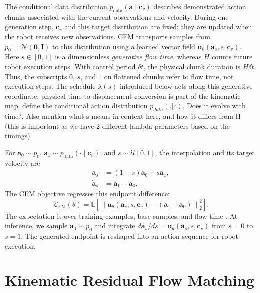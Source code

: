 \documentclass[10pt,twocolumn,letterpaper]{article}
\newcommand{\EditAP}[1]{{\color{blue} #1}}
\begin{document}
The conditional data distribution
$p_{\mathrm{data}}(\mathbf a\mid\mathbf c_v)$ describes demonstrated action
chunks associated with the current observations and velocity. During one
generation step, $\mathbf c_v$ and this target distribution are fixed;
they are updated when the robot receives new observations. CFM transports
samples from $p_0=\mathcal N(\mathbf 0,\mathbf I)$ to this distribution
using a learned vector field $\mathbf u_\theta(\mathbf a_s,s,\mathbf c_v)$.
Here $s\in[0,1]$ is a dimensionless \emph{generative flow time}, whereas
$H$ counts future robot execution steps. With control period $\delta t$,
the physical chunk duration is $H\delta t$. Thus, the subscripts $0$, $s$,
and $1$ on flattened chunks refer to flow time, not execution steps.
The schedule $\lambda(s)$ introduced below acts along this generative
coordinate; physical time-to-displacement conversion is part of the
kinematic map. \EditAP{define the conditional action distribution $p_{data}(.|c)$. Does it evolve with time?. Also mention what s means in context here, and how it differs from H (this is important as we have 2 different lambda parameters based on the timings)}

For $\mathbf a_0\sim p_0$,
$\mathbf a_1\sim p_{\mathrm{data}}(\cdot\mid\mathbf c_v)$, and
$s\sim\mathcal U[0,1]$, the interpolation and its target velocity are
\begin{align}
    \mathbf a_s &= (1-s)\mathbf a_0+s\mathbf a_1, \\
    \dot{\mathbf a}_s &= \mathbf a_1-\mathbf a_0.
\end{align}
The CFM objective regresses this endpoint difference:
\begin{equation}
    \mathcal L_{\mathrm{FM}}(\theta)
    = \mathbb E\!\left[
        \left\|\mathbf u_\theta(\mathbf a_s,s,\mathbf c_v)
        -(\mathbf a_1-\mathbf a_0)\right\|_2^2
    \right].
    \label{eq:fm_loss}
\end{equation}
The expectation is over training examples, base samples, and flow time
\citep{lipman2023flow,tong2023conditional}. At inference, we sample
$\mathbf a_0\sim p_0$ and integrate
$d\mathbf a_s/ds=\mathbf u_\theta(\mathbf a_s,s,\mathbf c_v)$ from
$s=0$ to $s=1$. The generated endpoint is reshaped into an action
sequence for robot execution.

\section{Kinematic Residual Flow Matching}
\label{sec:method}
\end{document}
